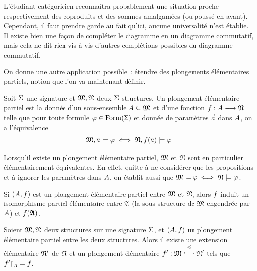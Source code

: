 \begin{remark}
  L'étudiant catégoricien reconnaîtra probablement une situation proche
  respectivement des coproduits et des sommes amalgamées (ou \og poussé en
  avant\fg). Cependant, il faut prendre garde au fait qu'ici, aucune
  universalité n'est établie. Il existe bien une façon de compléter le
  diagramme en un diagramme commutatif, mais cela ne dit rien vis-à-vis
  d'autres complétions possibles du diagramme commutatif.
\end{remark}

On donne une autre application possible~: étendre des plongements élémentaires
partiels, notion que l'on va maintenant définir.

\begin{definition}
  Soit $\Sigma$ une signature et $\mathfrak{M},\mathfrak{N}$ deux $\Sigma$-structures. Un
  plongement élémentaire partiel est la donnée d'un sous-ensemble
  $A\subseteq\mathfrak{M}$ et d'une fonction
  $f : \displaystyle A \longrightarrow \mathfrak{N}$
  telle que pour toute formule $\varphi\in\operatorname{Form}(\Sigma)$ et donnée de
  paramètres $\vec a$ dans $A$, on a l'équivalence
  \[\mathfrak{M},\overline{a}\models\varphi \iff \mathfrak{N},f(\overline{a})\models\varphi\]
\end{definition}

\begin{remark}
  Lorsqu'il existe un plongement élémentaire partiel, $\mathfrak{M}$ et $\mathfrak{N}$ sont
  en particulier élémentairement équivalentes. En effet, quitte à ne considérer
  que les propositions et à ignorer les paramètres dans $A$, on établit
  aussi que $\mathfrak{M}\models\varphi\iff\mathfrak{N}\models\varphi$.
\end{remark}

\begin{remark}
  Si $(A,f)$ est un plongement élémentaire partiel entre
  $\mathfrak{M}$ et $\mathfrak{N}$, alors $f$ induit un isomorphisme partiel
  élémentaire entre $\mathfrak{A}$ (la sous-structure de $\mathfrak{M}$ engendrée par
  $A$) et $f(\mathfrak{A})$.
\end{remark}

\begin{lemma}\label{lem.extend.part.elt.embed}
  Soient $\mathfrak{M},\mathfrak{N}$ deux structures sur une signature $\Sigma$, et
  $(A,f)$ un plongement élémentaire partiel entre les deux
  structures. Alors il existe une extension élémentaire $\mathfrak{N}'$ de $\mathfrak{N}$
  et un plongement élémentaire $f' : \displaystyle \mathfrak{M} \overset{\preccurlyeq}{\xhookrightarrow{\quad}} \mathfrak{N}'$ tels
  que $f'\mathbin{\upharpoonright}_{A} = f$.
\end{lemma}

